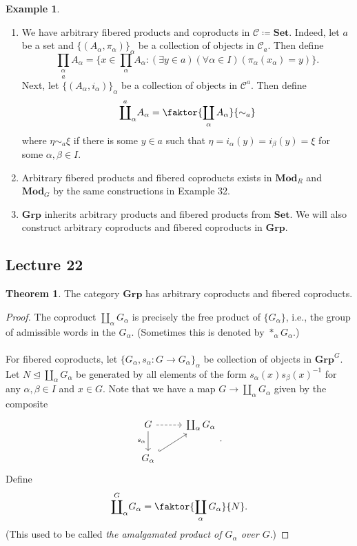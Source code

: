 \documentclass[10pt,letterpaper,cm]{nupset}
\theoremstyle{definition}
\newtheorem{exmp}{Example}
\newtheorem{theorem}{Theorem}
\newcommand{\1}{\mathbf{1}}
\renewcommand{\c}{\mathscr{C}}
\newcommand{\0}{\vec 0}
\begin{document}
\begin{exmp} $ $
\begin{enumerate}
\item We have arbitrary fibered products and coproducts in $\c\coloneqq  \mathbf{Set}$. Indeed, let $a$ be a set and $\{(A_{\alpha}, \pi_{\alpha})\}_{\alpha}$ be a collection of objects in $\c_a$. Then define $$\underset{a}{\prod_{\alpha}} A_{\alpha} = \{x \in \prod_{\alpha} A_{\alpha} :  (\exists y \in a)(\forall \alpha \in I)(\pi_{\alpha}(x_{\alpha}) = y)\}.$$ Next, let $\{(A_{\alpha}, i_{\alpha})\}_{\alpha}$ be a collection of objects in $\c^a$. Then define $$ 
\overset{a}{\coprod}_{\alpha}A_{\alpha} = \faktor{\coprod_{\alpha} A_{\alpha}}{\sim_a}$$ where $\eta \sim_a \xi$ if there is some $y \in a$ such that $\eta = i_{\alpha}(y) = i_{\beta}(y) = \xi$ for some $\alpha, \beta \in I$.
\item Arbitrary fibered products and fibered coproducts exists in $\mathbf{Mod}_R$ and $\mathbf{Mod}_G$ by the same constructions in Example 32.
\item $\mathbf{Grp}$ inherits arbitrary products and fibered products from $\mathbf{Set}$. We will also construct arbitrary coproducts and fibered coproducts in $\mathbf{Grp}$. 
\end{enumerate}
\end{exmp}

\subsection{Lecture 22}

\begin{theorem}
The category $\mathbf{Grp}$ has arbitrary coproducts and fibered coproducts.
\end{theorem}
\begin{proof}
The coproduct $\coprod_{\alpha} G_{\alpha}$ is precisely the free product of $\{G_{\alpha}\}$, i.e., the group of admissible words in the $G_{\alpha}$. (Sometimes this is denoted by $\ast_{\alpha} G_{\alpha}$.)
\\ \\ For fibered coproducts, let $\{G_{\alpha}, s_{\alpha} : G \to G_{\alpha}\}_{\alpha}$ be collection of objects in $\mathbf{Grp}^G$. Let $N \unlhd \coprod_{\alpha} G_{\alpha}$ be generated by all elements of the form $s_{\alpha}(x)s_{\beta}(x)^{-1}$ for any $\alpha, \beta \in I$ and $x\in G$. Note that we have a map $G \to \coprod_{\alpha} G_{\alpha}$ given by the composite
\[
\begin{tikzcd}
G \arrow[d, "s_{\alpha}"'] \arrow[r, dashed] & \coprod_{\alpha}G_{\alpha} \\
G_{\alpha} \arrow[ru, hook] & 
\end{tikzcd}
.\] Define $$\overset{G}{\coprod}_{\alpha} G_{\alpha} = \faktor{\coprod_{\alpha} G_{\alpha}}{N}.$$ (This used to be called \textit{the amalgamated product of $G_{\alpha}$ over $G$}.)
\end{proof}
\end{document}
